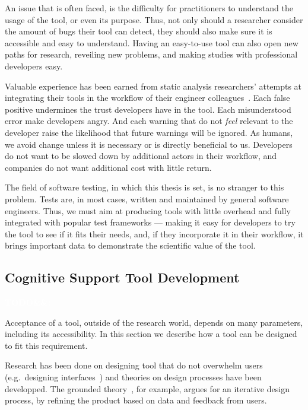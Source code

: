 \documentclass[a4paper,11pt]{sdm_internship}
\newcommand{\todo}[1]{\colorbox{Red!75}{\textcolor{white}{\textbf{TODO\ifx&#1&\else: #1\fi}}}}
\theoremstyle{definition}
\begin{document}
An issue that is often faced, is the difficulty for practitioners to understand the usage of the tool, or even its purpose.
Thus, not only should a researcher consider the amount of bugs their tool can detect, they should also make sure it is accessible and easy to understand.
Having an easy-to-use tool can also open new paths for research, reveiling new problems, and making studies with professional developers easy.

Valuable experience has been earned from static analysis researchers' attempts at integrating their tools in the workflow of their engineer colleagues~\cite{bessey2010few,sadowski2015tricorder,sadowski2018lessons}.
Each false positive undermines the trust developers have in the tool.
Each misunderstood error make developers angry.
And each warning that do not \emph{feel} relevant to the developer raise the likelihood that future warnings will be ignored.
As humans, we avoid change unless it is necessary or is directly beneficial to us.
Developers do not want to be slowed down by additional actors in their workflow, and companies do not want additional cost with little return.

The field of software testing, in which this thesis is set, is no stranger to this problem.
Tests are, in most cases, written and maintained by general software engineers.
Thus, we must aim at producing tools with little overhead and fully integrated with popular test frameworks --- making it easy for developers to try the tool to see if it fits their needs, and, if they incorporate it in their workflow, it brings important data to demonstrate the scientific value of the tool.

\subsection{Cognitive Support Tool Development}%
\label{ssec:cognitive_support}
\todo{}

Acceptance of a tool, outside of the research world, depends on many parameters, including its accessibility.
In this section we describe how a tool can be designed to fit this requirement.

Research has been done on designing tool that do not overwhelm users (e.g.\ designing interfaces~\cite{oviatt2006human}) and theories on design processes have been developped.
The grounded theory~\cite{stol2016grounded}, for example, argues for an iterative design process, by refining the product based on data and feedback from users.
\end{document}
